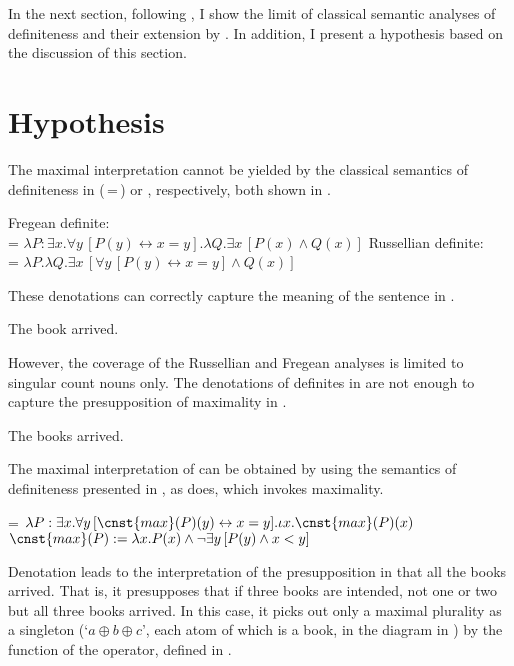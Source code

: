 \documentclass[output=paper]{langscibook}
\begin{document}
In the next section, following \citet{Heim2011}, I show the limit of classical semantic analyses of definiteness and their extension by \citet{Sharvy1980}. In addition, I present a hypothesis based on the discussion of this section.

\section{Hypothesis}\label{AN}

The maximal interpretation cannot be yielded by the classical semantics of definiteness in
\citeauthor{Frege1892} (\citeyear{Frege1892}\,=\,\citeyear{Frege1980}) or \citet{Russell1905}, respectively, both shown in .\largerpage

\ea\label{CL}
\ea Fregean definite: \\
 = $\lambda P: \exists x . \forall y \, [P(y) \leftrightarrow x=y]. \lambda Q . \exists x \, [P(x) \wedge Q(x)]$
\ex Russellian definite: \\
 = $\lambda P . \lambda Q . \exists x \, [ \forall y \, [P(y) \leftrightarrow x=y] \wedge Q(x)]$
\z\z

\noindent These denotations can correctly capture the meaning of the sentence in .

\ea\label{DSG} The book arrived.
\z

\noindent However, the coverage of the Russellian and Fregean analyses is limited to singular count nouns only. The denotations of definites in  are not enough to capture the presupposition of maximality in .

\ea\label{DPL} The books arrived. \z

\noindent The maximal interpretation of  can be obtained by using the semantics of definiteness presented in , as \citet{Sharvy1980} does, which invokes maximality.

\ea\label{sem}
\ea\label{defsem}
 = $\lambda P : \exists x . \forall y \, [ \cnst{max}(P)(y) \leftrightarrow x=y ]. \iota x . \cnst{max}(P)(x)$
\ex\label{defmax}
$\cnst{max}(P) := \lambda x . P(x) \wedge \lnot \exists y \, [ P(y) \wedge x < y ]$
\z\z

\noindent Denotation  leads to the interpretation of the presupposition in  that all the books arrived. That is, it presupposes that if three books are intended, not one or two but all three books arrived. In this case, it picks out only a maximal plurality as a singleton
(`$a\oplus b\oplus c$', each atom of which is a book, in the diagram in ) by the function of the  operator, defined in .
\end{document}

